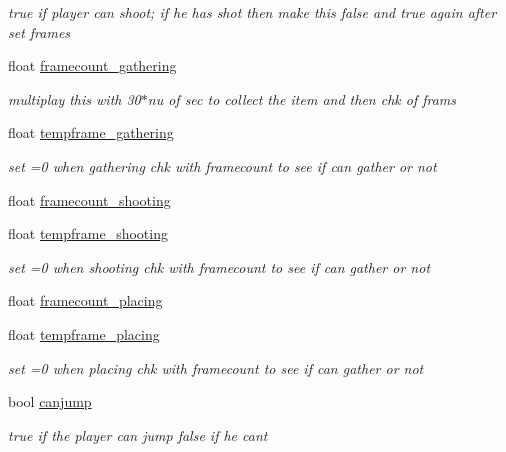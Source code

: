 \begin{DoxyCompactItemize}
\begin{DoxyCompactList}\small\item\em true if player can shoot; if he has shot then make this false and true again after set frames \end{DoxyCompactList}\item 
float \hyperlink{classoctet_1_1minecraft__wars_a103c8c498e1a7a0bcddf22bb4ea4267f}{framecount\+\_\+gathering}
\begin{DoxyCompactList}\small\item\em multiplay this with 30$\ast$nu of sec to collect the item and then chk of frams \end{DoxyCompactList}\item 
float \hyperlink{classoctet_1_1minecraft__wars_a16ff1afbb738dec45fe41a8c90caf3d9}{tempframe\+\_\+gathering}
\begin{DoxyCompactList}\small\item\em set =0 when gathering chk with framecount to see if can gather or not \end{DoxyCompactList}\item 
float \hyperlink{classoctet_1_1minecraft__wars_a5cb24438a620f2ae64a95c3dcf58f0bb}{framecount\+\_\+shooting}
\item 
float \hyperlink{classoctet_1_1minecraft__wars_ac0f39aace1058f32df099906feed5f72}{tempframe\+\_\+shooting}
\begin{DoxyCompactList}\small\item\em set =0 when shooting chk with framecount to see if can gather or not \end{DoxyCompactList}\item 
float \hyperlink{classoctet_1_1minecraft__wars_aeb0766394c72986b610e8c7e513ff81b}{framecount\+\_\+placing}
\item 
float \hyperlink{classoctet_1_1minecraft__wars_a702c765ff3b72d26326f0c23dafee7b5}{tempframe\+\_\+placing}
\begin{DoxyCompactList}\small\item\em set =0 when placing chk with framecount to see if can gather or not \end{DoxyCompactList}\item 
bool \hyperlink{classoctet_1_1minecraft__wars_abf8f37ba4570f98b1361919b56460df2}{canjump}
\begin{DoxyCompactList}\small\item\em true if the player can jump false if he cant \end{DoxyCompactList}\item 

\end{DoxyCompactItemize}
